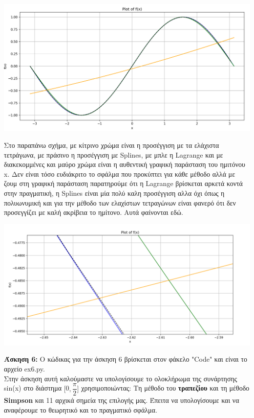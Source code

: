 \documentclass{article}
\begin{document}
\begin{center}
\includegraphics[width=.9\linewidth]{Plot.png}
\end{center}
Στο παραπάνω σχήμα, με κίτρινο χρώμα είναι η προσέγγιση με τα ελάχιστα τετράγωνα, με πράσινο η προσέγγιση με Splines, με μπλε η Lagrange και με διακεκομμένες και μαύρο χρώμα είναι η αυθεντική γραφική παράσταση του ημιτόνου x. Δεν είναι τόσο ευδιάκριτο το σφάλμα που προκύπτει για κάθε μέθοδο αλλά με ζουμ στη γραφική παράσταση παρατηρούμε ότι η Lagrange βρίσκεται αρκετά κοντά στην πραγματική, η Splines είναι μία πολύ καλη προσέγγιση αλλα όχι όπως η πολυωνυμική και για την μέθοδο των ελαχίστων τετραγώνων είναι φανερό ότι δεν προσεγγίζει με καλή ακρίβεια το ημίτονο. Αυτά φαίνονται εδώ.

\begin{center}
    \includegraphics[width=.9\linewidth]{zoomed.png}
\end{center}
\par\textbf{Άσκηση 6:}
Ο κώδικας για την άσκηση 6 βρίσκεται στον φάκελο "Code" και είναι το αρχείο ex6.py.\\
Στην άσκηση αυτή καλούμαστε να υπολογίσουμε το ολοκλήρωμα της συνάρτησης sin(x) στο διάστημα 
$[$0$, \dfrac{\pi}{2}]$ χρησιμοποιώντας: Τη μέθοδο του \textbf{τραπεζίου} και τη μέθοδο \textbf{Simpson} 
και 11 αρχικά σημεία της επιλογής μας. Έπειτα να υπολογίσουμε και να αναφέρουμε το θεωρητικό και το 
πραγματικό σφάλμα.\\
\end{document}
